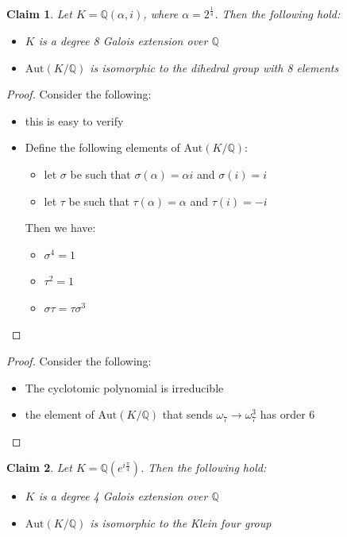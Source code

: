\documentclass{article}
\newtheorem{claim}{Claim}
\begin{document}
\begin{claim}
  Let $K=\mathbb{Q}(\alpha,i)$, where $\alpha=2^\frac{1}{4}$. Then the following hold:
  \begin{itemize}
    \item $K$ is a degree 8 Galois extension over $\mathbb{Q}$
    \item $\text{Aut}(K/\mathbb{Q})$ is isomorphic to the dihedral group with 8 elements
  \end{itemize}
\end{claim}

\begin{proof}
  Consider the following:
  \begin{itemize}
    \item this is easy to verify
    \item Define the following elements of $\text{Aut}(K/\mathbb{Q})$:
          \begin{itemize}
            \item let $\sigma$ be such that $\sigma(\alpha)=\alpha i$ and $\sigma(i)=i$
            \item let $\tau$ be such that $\tau(\alpha)=\alpha$ and $\tau(i)=-i$ 
          \end{itemize}
          Then we have:
          \begin{itemize}
            \item $\sigma^4=1$
            \item $\tau^2=1$ 
            \item $\sigma \tau = \tau \sigma^3$
          \end{itemize}
  \end{itemize}
\end{proof}



\begin{proof}
  Consider the following:
  \begin{itemize}
    \item The cyclotomic polynomial is irreducible
    \item the element of $\text{Aut}(K  / \mathbb{Q})$ that sends $\omega_7 \to \omega_7^3$ has order 6
  \end{itemize}
\end{proof}

\begin{claim}
  Let $K=\mathbb{Q}(e^{i\frac{\pi}{4}})$. Then the following hold:
  \begin{itemize}
    \item $K$ is a degree 4 Galois extension over $\mathbb{Q}$
    \item $\text{Aut}(K/\mathbb{Q})$ is isomorphic to the Klein four group
  \end{itemize}
\end{claim}
\end{document}

